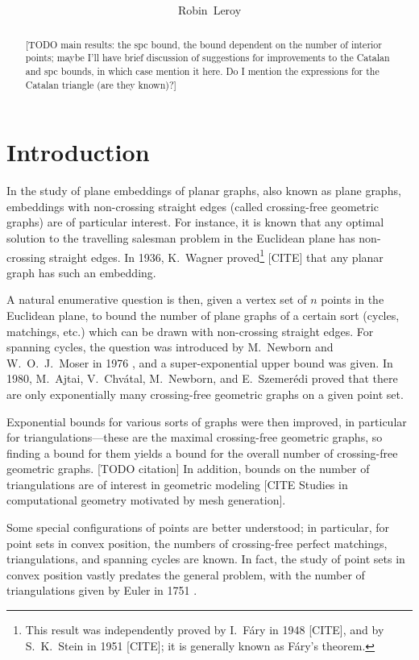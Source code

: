 \documentclass[10pt, a4paper, twoside]{basestyle}
\title{%
\textdisplay{%
Crossing-Free Perfect Matchings%
}%
}
\author{Robin~Leroy}
\begin{document}
\maketitle
\begin{abstract}
[TODO main results: the spc bound, the bound dependent on the number of interior points;
maybe I'll have brief discussion of suggestions for improvements to the Catalan and spc
bounds, in which case mention it here.
Do I mention the expressions for the Catalan triangle (are they known)?]
\end{abstract}

\section*{Introduction}
In the study of plane embeddings of planar graphs, also known as plane graphs,
embeddings with non-crossing straight edges (called crossing-free geometric graphs) are of particular
interest.
For instance, it is known \cite{LeeuwenSchoone1981} that any optimal solution to the travelling salesman problem in the
Euclidean plane has non-crossing straight edges.
In 1936, K.~Wagner proved\footnote{This result was independently proved by I.~Fáry in 1948 [CITE], and by
S.~K.~Stein in 1951 [CITE]; it is generally known as Fáry's theorem.} [CITE] that any planar graph has such an
embedding.

A natural enumerative question is then, given a vertex set of $n$ points in the Euclidean plane,
to bound the number of plane graphs of a certain sort (cycles, matchings, etc.) which can be
drawn with non-crossing straight edges.
For spanning cycles, the question was introduced by M.~Newborn and W.~O.~J.~Moser in 1976 \cite{NewbornMoser1980},
and a super-exponential upper bound was given.
In 1980, M.~Ajtai, V.~Chvátal, M.~Newborn, and E.~Szemerédi \cite{AjtaiChvatalNewbornSzemeredi1982}
proved that there are only exponentially many crossing-free geometric graphs on a given point set.

Exponential bounds for various sorts of graphs were then improved, in particular for triangulations---these are
the maximal crossing-free geometric graphs, so finding a bound for them yields a bound
for the overall number of crossing-free geometric graphs. [TODO citation] In addition, bounds on the number of triangulations
are of interest in geometric modeling [CITE Studies in computational geometry motivated by mesh generation].

Some special configurations of points are better understood; in particular, for point sets in convex position,
the numbers of crossing-free perfect matchings, triangulations, and spanning cycles are known. In fact, the study
of point sets in convex position vastly predates the general problem, with the number of triangulations given by
Euler in 1751 \cite{Euler1751}.
\end{document}
